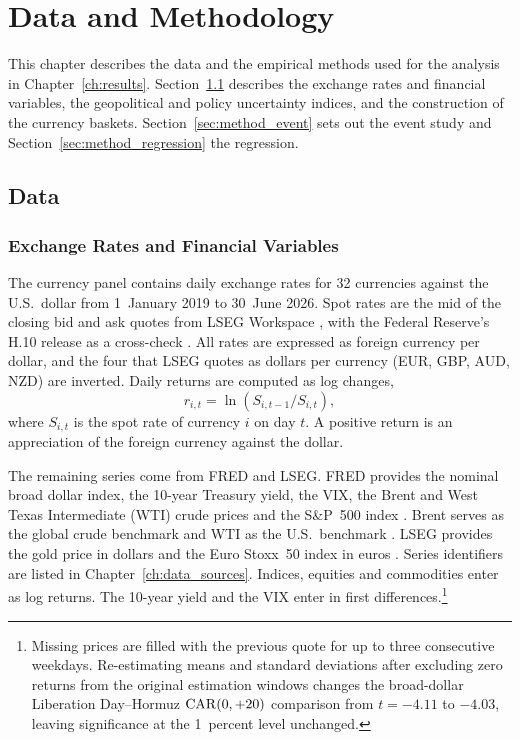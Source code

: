 
\chapter{Data and Methodology}
\label{ch:methodology}

This chapter describes the data and the empirical methods used for the analysis in Chapter~\ref{ch:results}. Section~\ref{sec:data} describes the exchange rates and financial variables, the geopolitical and policy uncertainty indices, and the construction of the currency baskets. Section~\ref{sec:method_event} sets out the event study and Section~\ref{sec:method_regression} the regression.

\section{Data}
\label{sec:data}

\subsection{Exchange Rates and Financial Variables}
\label{sec:data_fx}

The currency panel contains daily exchange rates for 32 currencies against the U.S.\ dollar from 1~January 2019 to 30~June 2026. Spot rates are the mid of the closing bid and ask quotes from LSEG Workspace \parencite{ds_lseg_spot}, with the Federal Reserve's H.10 release as a cross-check \parencite{ds_fed_h10}. All rates are expressed as foreign currency per dollar, and the four that LSEG quotes as dollars per currency (EUR, GBP, AUD, NZD) are inverted. Daily returns are computed as log changes,
\begin{equation*}
  r_{i,t}=\ln(S_{i,t-1}/S_{i,t}),
\end{equation*}
where $S_{i,t}$ is the spot rate of currency $i$ on day $t$. A positive return is an appreciation of the foreign currency against the dollar.

The remaining series come from FRED and LSEG. FRED provides the nominal broad dollar index, the 10-year Treasury yield, the VIX, the Brent and West Texas Intermediate (WTI) crude prices and the S\&P~500 index \parencite{ds_fed_dollar,ds_fed_yields,ds_cboe_vix,ds_eia_energy,ds_spdji_sp500}. Brent serves as the global crude benchmark and WTI as the U.S.\ benchmark \parencite{eia_2022_ukraine}. LSEG provides the gold price in dollars and the Euro Stoxx~50 index in euros \parencite{ds_lseg_assets}. Series identifiers are listed in Chapter~\ref{ch:data_sources}. Indices, equities and commodities enter as log returns. The 10-year yield and the VIX enter in first differences.\footnote{Missing prices are filled with the previous quote for up to three consecutive weekdays. Re-estimating means and standard deviations after excluding zero returns from the original estimation windows changes the broad-dollar Liberation Day--Hormuz $\mathrm{CAR}(0,+20)$ comparison from $t=-4.11$ to $-4.03$, leaving significance at the 1~percent level unchanged.}


